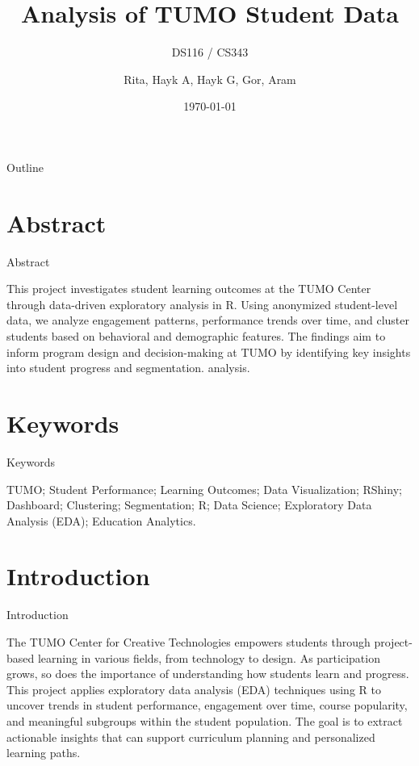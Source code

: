 \documentclass[11pt]{beamer}
\title[Final Project]{\textbf{Analysis of TUMO Student Data}}
\subtitle{DS116 / CS343}
\author{Rita, Hayk A, Hayk G, Gor, Aram}
\date{\today}
\begin{document}
\begin{frame}[plain]
  \titlepage
\end{frame}

\begin{frame}{Outline}
  \tableofcontents
\end{frame}

\section{Abstract}
\begin{frame}{Abstract}
  \begin{itemize}
    This project investigates student learning outcomes at the TUMO Center through data-driven exploratory analysis in R.
Using anonymized student-level data, we analyze engagement patterns, performance trends over time, and cluster students based on behavioral and demographic features.
The findings aim to inform program design and decision-making at TUMO by identifying key insights into student progress and segmentation. analysis.
  \end{itemize}
\end{frame}

\section{Keywords}
\begin{frame}{Keywords}
  \begin{itemize}
    TUMO; Student Performance; Learning Outcomes; Data Visualization; RShiny; Dashboard; Clustering; Segmentation; R; Data Science; Exploratory Data Analysis (EDA); Education Analytics.
  \end{itemize}
\end{frame}

\section{Introduction}
\begin{frame}{Introduction}
  \begin{itemize}
    The TUMO Center for Creative Technologies empowers students through project-based learning in various fields, from technology to design. As participation grows, so does the importance of understanding how students learn and progress. This project applies exploratory data analysis (EDA) techniques using R to uncover trends in student performance, engagement over time, course popularity, and meaningful subgroups within the student population. The goal is to extract actionable insights that can support curriculum planning and personalized learning paths.
  \end{itemize}
\end{frame}
\end{document}
